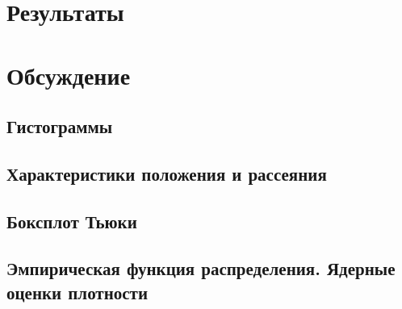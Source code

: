 \documentclass[14pt,a4paper,article]{ncc}
\begin{document}


\section{Результаты}





\section{Обсуждение}

\subsection{Гистограммы}


\subsection{Характеристики положения и рассеяния}


\subsection{Боксплот Тьюки}


\subsection{Эмпирическая функция распределения. Ядерные оценки плотности}



\end{document}

